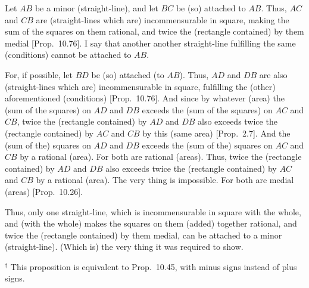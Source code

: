 \begin{Parallel}{}{}
{\epsfysize=0.25in 
\centerline{}

Let $AB$ be a minor (straight-line), and let $BC$ be (so) attached to $AB$.
Thus, $AC$ and $CB$ are (straight-lines which are) incommensurable  in square, making the sum of
the squares on them rational, and twice the (rectangle contained) by them
medial [Prop.~10.76]. I say that another
another straight-line fulfilling the same (conditions) cannot be
attached to $AB$.

For, if possible, let $BD$ be (so) attached (to $AB$). Thus, $AD$
and $DB$ are also (straight-lines which are) incommensurable in square, fulfilling the (other) aforementioned
(conditions) [Prop.~10.76]. And since
by whatever (area) the (sum of the squares) on $AD$ and $DB$
exceeds the (sum of the squares) on $AC$ and $CB$, 
twice the (rectangle contained) by $AD$ and $DB$ also exceeds
twice the (rectangle contained) by $AC$ and $CB$  by this (same area) [Prop.~2.7]. And the (sum of the) squares on
$AD$ and $DB$ exceeds the (sum of the) squares on $AC$ and $CB$
by a rational (area). For both are rational (areas). Thus, twice the
(rectangle contained) by $AD$ and $DB$ also exceeds
twice the (rectangle contained) by $AC$ and $CB$ by a rational (area).
The very thing is impossible. For both are medial (areas) [Prop.~10.26].

Thus,  only one straight-line, which is  incommensurable in square
with the whole, and (with the whole) makes the  squares on them
(added) together rational, and twice the (rectangle contained) by them medial, can be
attached to a minor (straight-line). (Which is) the very thing it was required to
show.}
\end{Parallel}
{\footnotesize\noindent$^\dag$ This proposition is equivalent to 
Prop.~10.45, with minus signs instead of plus signs.}

